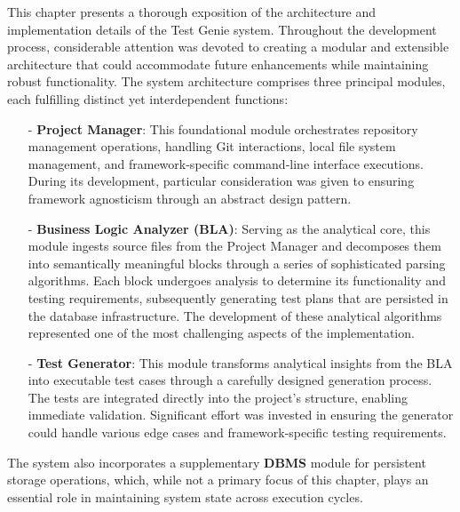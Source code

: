 This chapter presents a thorough exposition of the architecture and implementation details of the Test Genie system. Throughout the development process, considerable attention was devoted to creating a modular and extensible architecture that could accommodate future enhancements while maintaining robust functionality. The system architecture comprises three principal modules, each fulfilling distinct yet interdependent functions:

\begin{itemize}
    \item[-] \textbf{Project Manager}: This foundational module orchestrates repository management operations, handling Git interactions, local file system management, and framework-specific command-line interface executions. During its development, particular consideration was given to ensuring framework agnosticism through an abstract design pattern.
    
    \item[-] \textbf{Business Logic Analyzer (BLA)}: Serving as the analytical core, this module ingests source files from the Project Manager and decomposes them into semantically meaningful blocks through a series of sophisticated parsing algorithms. Each block undergoes analysis to determine its functionality and testing requirements, subsequently generating test plans that are persisted in the database infrastructure. The development of these analytical algorithms represented one of the most challenging aspects of the implementation.
    
    \item[-] \textbf{Test Generator}: This module transforms analytical insights from the BLA into executable test cases through a carefully designed generation process. The tests are integrated directly into the project's structure, enabling immediate validation. Significant effort was invested in ensuring the generator could handle various edge cases and framework-specific testing requirements.
\end{itemize}

The system also incorporates a supplementary \textbf{DBMS} module for persistent storage operations, which, while not a primary focus of this chapter, plays an essential role in maintaining system state across execution cycles.


